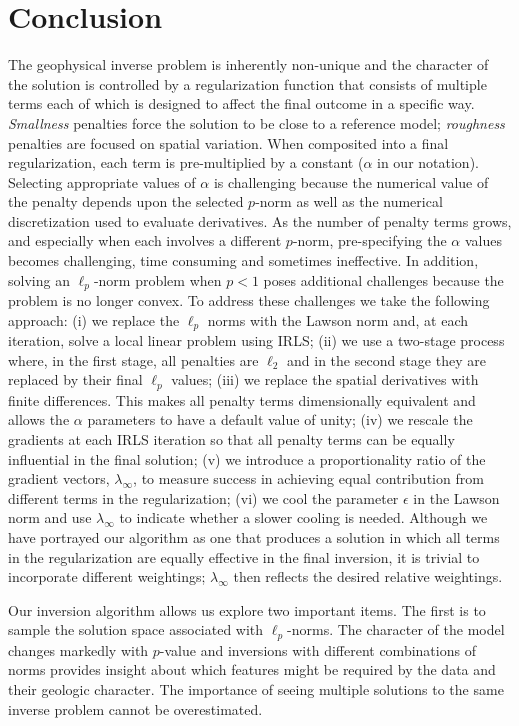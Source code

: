 \documentclass[extra,referee]{gji}
\begin{document}
\section{Conclusion}
The geophysical inverse problem is inherently non-unique and the character of the solution is controlled by a regularization function that consists of multiple terms each of which is designed to affect the final outcome in a specific way. \emph{Smallness} penalties force the solution to be close to a reference model; \emph{roughness} penalties are focused on spatial variation. When composited into a final regularization, each term is pre-multiplied by a constant ($\alpha$ in our notation). Selecting appropriate values of $\alpha$ is challenging because the numerical value of the penalty depends upon the selected $p$-norm as well as the numerical discretization used to evaluate derivatives. As the number of penalty terms grows, and especially when each involves a different $p$-norm, pre-specifying the $\alpha$ values becomes challenging, time consuming and sometimes ineffective. In addition, solving an $\ell_p$-norm problem when $p<1$ poses additional challenges because the problem is no longer convex. To address these challenges we take the following approach: (i) we replace the $\ell_p$ norms with the Lawson norm and, at each iteration, solve a local linear problem using IRLS; (ii) we use a two-stage process where, in the first stage, all penalties are $\ell_2$ and in the second stage they are replaced by their final $\ell_p$ values; (iii) we replace the spatial derivatives with finite differences. This makes all penalty terms dimensionally equivalent and allows the $\alpha$ parameters to have a default value of unity; (iv) we rescale the gradients at each IRLS iteration so that all penalty terms can be equally influential in the final solution; (v) we introduce a proportionality ratio of the gradient vectors, ${\lambda_\infty}$, to measure success in achieving equal contribution from different terms in the regularization; (vi) we cool the parameter $\epsilon$ in the Lawson norm and use ${\lambda_\infty}$ to indicate whether a slower cooling is needed. Although we have portrayed our algorithm as one that produces a solution in which all terms in the regularization are equally effective in the final inversion, it is trivial to incorporate different weightings; ${\lambda_\infty}$ then reflects the desired relative weightings.

Our inversion algorithm allows us explore two important items. The first is to sample the solution space associated with $\ell_p$-norms. The character of the model changes markedly with $p$-value and inversions with different combinations of norms provides insight about which features might be required by the data and their geologic character. The importance of seeing multiple solutions to the same inverse problem cannot be overestimated.
\end{document}

